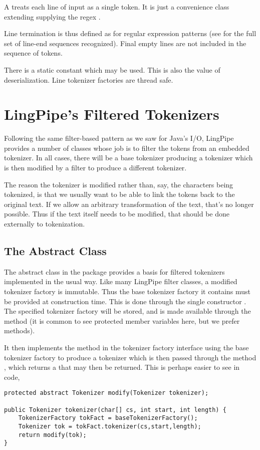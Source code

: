 A  treats each line of input as a single
token.  It is just a convenience class extending
 supplying the regex .  

Line termination is thus defined as for regular expression patterns (see
 for the full set of line-end sequences
recognized).  Final empty lines are not included in the sequence of
tokens.

There is a static constant  which may be used.  This is
also the value of deserialization.  Line tokenizer factories are thread
safe.


\section{LingPipe's Filtered Tokenizers}

Following the same filter-based pattern as we saw for Java's I/O,
LingPipe provides a number of classes whose job is to filter the
tokens from an embedded tokenizer.  In all cases, there will be a base
tokenizer producing a tokenizer which is then modified by a filter to
produce a different tokenizer.  

The reason the tokenizer is modified rather than, say, the characters
being tokenized, is that we usually want to be able to link the tokens
back to the original text.  If we allow an arbitrary transformation of
the text, that's no longer possible.  Thus if the text itself needs to
be modified, that should be done externally to tokenization.

\subsection{The  Abstract Class}

The abstract class  in the package
 provides a basis for filtered tokenizers
implemented in the usual way.  Like many LingPipe filter classes, a
modified tokenizer factory is immutable.  Thus the base tokenizer
factory it contains must be provided at construction time.  This is
done through the single constructor
.  The specified
tokenizer factory will be stored, and is made available through the
method  (it is common to see protected
member variables here, but we prefer methods).

It then implements the  method in the
tokenizer factory interface using the base tokenizer factory to 
produce a tokenizer which is then passed through the method
, which returns a  that may
then be returned.  This is perhaps easier to see in code,
%
\begin{verbatim}
protected abstract Tokenizer modify(Tokenizer tokenizer);

public Tokenizer tokenizer(char[] cs, int start, int length) {
    TokenizerFactory tokFact = baseTokenizerFactory();
    Tokenizer tok = tokFact.tokenizer(cs,start,length);
    return modify(tok);
}
\end{verbatim}

